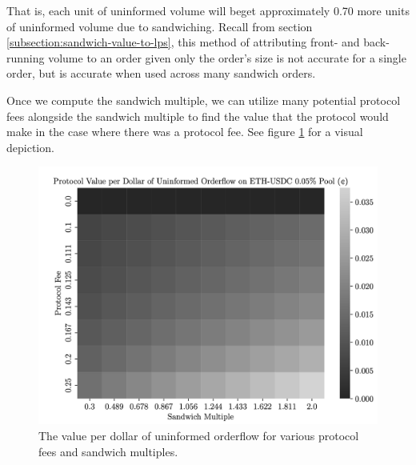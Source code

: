 
        
    That is, each unit of uninformed volume will beget approximately 0.70 more units of uninformed volume due to sandwiching. Recall from section \ref{subsection:sandwich-value-to-lps}, this method of attributing front- and back-running volume to an order given only the order's size is not accurate for a single order, but is accurate when used across many sandwich orders.

    Once we compute the sandwich multiple, we can utilize many potential protocol fees alongside the sandwich multiple to find the value that the protocol would make in the case where there was a protocol fee. See figure \ref{fig:proto-value-per-dollar-many-sandwich-multiple} for a visual depiction.

    \begin{figure}
        \centering
        \includegraphics[scale=.33]{figs/protocol-value-per-orderflow-dollar.png}
        \caption{The value per dollar of uninformed orderflow for various protocol fees and sandwich multiples.}
        \label{fig:proto-value-per-dollar-many-sandwich-multiple}
    \end{figure}

